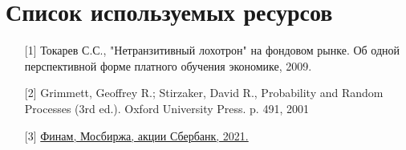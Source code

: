 \chapter{Список используемых ресурсов}

\begin{enumerate}
\item[{[1]}] Токарев С.С., "Нетранзитивный лохотрон" на фондовом рынке. Об одной перспективной форме платного обучения экономике, 2009.
\item[{[2]}] Grimmett, Geoffrey R.; Stirzaker, David R., Probability and Random Processes (3rd ed.). Oxford University Press. p. 491, 2001
\item[{[3]}] \href{https://www.finam.ru/profile/moex-akcii/sberbank/export/}{Финам, Мосбиржа, акции Сбербанк, 2021.}

\end{enumerate}

